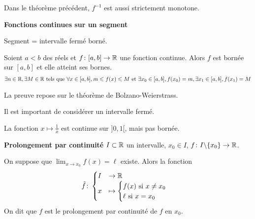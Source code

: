 \begin{remarque}
Dans le théorème précédent, $f^{-1}$ est aussi strictement monotone.
\end{remarque}

\par \noindent \textbf{Fonctions continues sur un segment}

\begin{remarque}
Segment = intervalle fermé borné.
\end{remarque}
\begin{graybox}
\begin{theoreme}
Soient $a < b$ des réels et $f \colon [a, b] \to \mathbb{R}$ une fonction continue. Alors $f$ est bornée sur $[a, b]$ et elle atteint ses bornes.
\begin{align*}
\exists n \in \mathbb{R}, \exists M \in \mathbb{R} \text{ tels que } \forall x \in [a, b], m \leqslant f(x) \leqslant M \text{ et } \exists x_0 \in [a, b], f(x_0) = m, \exists x_1 \in [a, b], f(x_1) = M
\end{align*}
\end{theoreme}
\end{graybox}
\par \noindent La preuve repose sur le théorème de Bolzano-Weierstrass.
\begin{remarque}
Il est important de considérer un intervalle fermé.
\end{remarque}

\begin{exemple}
La fonction $x \mapsto \frac{1}{x}$ est continue sur $]0, 1[$, mais pas bornée.
\end{exemple}

\par \noindent \textbf{Prolongement par continuité}
$I \subset \mathbb{R}$ un intervalle, $x_0 \in I$, $f \colon I \backslash \{x_0\} \to \mathbb{R}$.
\par \noindent On suppose que $\lim_{x \to x_0} f(x) = \ell$ existe. Alors la fonction
\begin{align*}
\tilde{f} \colon
\begin{cases}
I &\to \mathbb{R} \\
x &\mapsto
\begin{cases}
f(x) \text{ si } x \neq x_0 \\
\ell \text{ si } x = x_0
\end{cases}
\end{cases}
\end{align*}
On dit que $f$ est le prolongement par continuité de $f$ en $x_0$.

